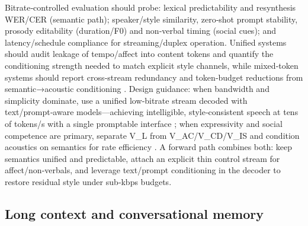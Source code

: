 Bitrate‑controlled evaluation should probe: lexical predictability and resynthesis WER/CER (semantic path); speaker/style similarity, zero‑shot prompt stability, prosody editability (duration/F0) and non‑verbal timing (social cues); and latency/schedule compliance for streaming/duplex operation. Unified systems should audit leakage of tempo/affect into content tokens and quantify the conditioning strength needed to match explicit style channels, while mixed‑token systems should report cross‑stream redundancy and token‑budget reductions from semantic→acoustic conditioning \cite{yang2025diffsoundstreamefficientspeechtokenizati}. Design guidance: when bandwidth and simplicity dominate, use a unified low‑bitrate stream decoded with text/prompt‑aware models—achieving intelligible, style‑consistent speech at tens of tokens/s with a single promptable interface \cite{zhang2024speechtokenizerunifiedspeechtokenizerlar,wang2025dualspeechlmtowardsunifiedspeechundersta,yang2025diffsoundstreamefficientspeechtokenizati,zhao2024textlessstreamingspeechtranslationsemant,jiang2025universalspeechtokenlearninglowbitratene}; when expressivity and social competence are primary, separate V_L from V_AC/V_CD/V_IS and condition acoustics on semantics for rate efficiency \cite{yang2025diffsoundstreamefficientspeechtokenizati,wang2025bossbeyondsemanticspeech}. A forward path combines both: keep semantics unified and predictable, attach an explicit thin control stream for affect/non‑verbals, and leverage text/prompt conditioning in the decoder to restore residual style under sub‑kbps budgets.

\subsection{Long context and conversational memory} \label{subsec:Long context and conversational memory}

